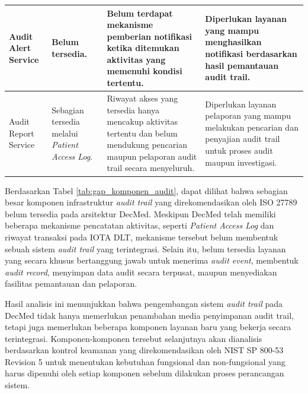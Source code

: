 \begin{xltabular}{\textwidth}{|p{3.2cm}|p{3.2cm}|X|X|}
Audit Alert Service &
Belum tersedia. &
Belum terdapat mekanisme pemberian notifikasi ketika ditemukan aktivitas yang memenuhi kondisi tertentu. &
Diperlukan layanan yang mampu menghasilkan notifikasi berdasarkan hasil pemantauan audit trail.\\
\hline

Audit Report Service &
Sebagian tersedia melalui \textit{Patient Access Log}. &
Riwayat akses yang tersedia hanya mencakup aktivitas tertentu dan belum mendukung pencarian maupun pelaporan audit trail secara menyeluruh. &
Diperlukan layanan pelaporan yang mampu melakukan pencarian dan penyajian audit trail untuk proses audit maupun investigasi.\\
\hline

\end{xltabular}

Berdasarkan Tabel \ref{tab:gap_komponen_audit}, dapat dilihat bahwa sebagian besar komponen infrastruktur \textit{audit trail} yang direkomendasikan oleh ISO 27789 belum tersedia pada arsitektur DecMed. Meskipun DecMed telah memiliki beberapa mekanisme pencatatan aktivitas, seperti \textit{Patient Access Log} dan riwayat transaksi pada IOTA DLT, mekanisme tersebut belum membentuk sebuah sistem \textit{audit trail} yang terintegrasi. Selain itu, belum tersedia layanan yang secara khusus bertanggung jawab untuk menerima \textit{audit event}, membentuk \textit{audit record}, menyimpan data audit secara terpusat, maupun menyediakan fasilitas pemantauan dan pelaporan.

Hasil analisis ini menunjukkan bahwa pengembangan sistem \textit{audit trail} pada DecMed tidak hanya memerlukan penambahan media penyimpanan audit trail, tetapi juga memerlukan beberapa komponen layanan baru yang bekerja secara terintegrasi. Komponen-komponen tersebut selanjutnya akan dianalisis berdasarkan kontrol keamanan yang direkomendasikan oleh NIST SP 800-53 Revision 5 untuk menentukan kebutuhan fungsional dan non-fungsional yang harus dipenuhi oleh setiap komponen sebelum dilakukan proses perancangan sistem.